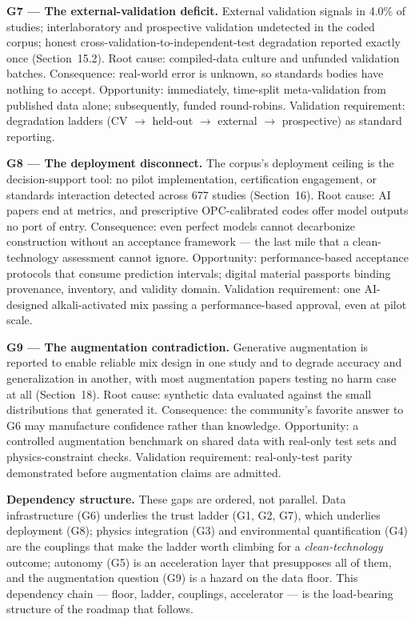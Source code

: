 \documentclass[pdflatex,sn-basic]{sn-jnl}
\begin{document}
\textbf{G7 --- The external-validation deficit.} External validation signals in 4.0\% of studies; interlaboratory and prospective validation undetected in the coded corpus; honest cross-validation-to-independent-test degradation reported exactly once (Section~15.2). Root cause: compiled-data culture and unfunded validation batches. Consequence: real-world error is unknown, so standards bodies have nothing to accept. Opportunity: immediately, time-split meta-validation from published data alone; subsequently, funded round-robins. Validation requirement: degradation ladders (CV $\rightarrow$ held-out $\rightarrow$ external $\rightarrow$ prospective) as standard reporting.

\textbf{G8 --- The deployment disconnect.} The corpus's deployment ceiling is the decision-support tool: no pilot implementation, certification engagement, or standards interaction detected across 677 studies (Section~16). Root cause: AI papers end at metrics, and prescriptive OPC-calibrated codes offer model outputs no port of entry. Consequence: even perfect models cannot decarbonize construction without an acceptance framework --- the last mile that a clean-technology assessment cannot ignore. Opportunity: performance-based acceptance protocols that consume prediction intervals; digital material passports binding provenance, inventory, and validity domain. Validation requirement: one AI-designed alkali-activated mix passing a performance-based approval, even at pilot scale.

\textbf{G9 --- The augmentation contradiction.} Generative augmentation is reported to enable reliable mix design in one study and to degrade accuracy and generalization in another, with most augmentation papers testing no harm case at all (Section~18). Root cause: synthetic data evaluated against the small distributions that generated it. Consequence: the community's favorite answer to G6 may manufacture confidence rather than knowledge. Opportunity: a controlled augmentation benchmark on shared data with real-only test sets and physics-constraint checks. Validation requirement: real-only-test parity demonstrated before augmentation claims are admitted.

\textbf{Dependency structure.} These gaps are ordered, not parallel. Data infrastructure (G6) underlies the trust ladder (G1, G2, G7), which underlies deployment (G8); physics integration (G3) and environmental quantification (G4) are the couplings that make the ladder worth climbing for a \emph{clean-technology} outcome; autonomy (G5) is an acceleration layer that presupposes all of them, and the augmentation question (G9) is a hazard on the data floor. This dependency chain --- floor, ladder, couplings, accelerator --- is the load-bearing structure of the roadmap that follows.
\end{document}
